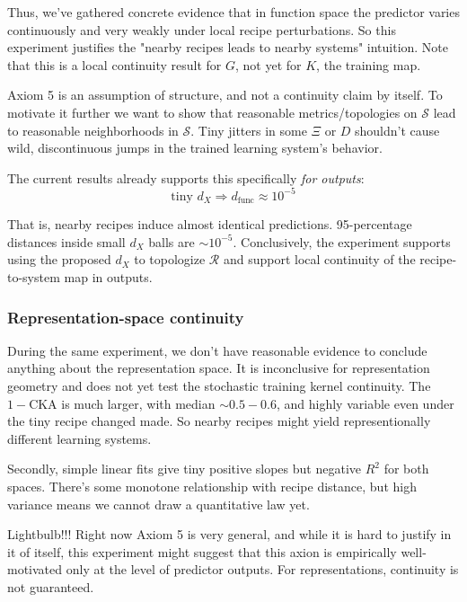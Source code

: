 \documentclass[12pt]{article}
\begin{document}
Thus, we've gathered concrete evidence that in function space the predictor varies continuously and very weakly under local recipe perturbations. So this experiment justifies the "nearby recipes leads to nearby systems" intuition. Note that this is a local continuity result for $G$, not yet for $K$, the training map.

Axiom 5 is an assumption of structure, and not a continuity claim by itself. To motivate it further we want to show that reasonable metrics/topologies on $\mathcal S$ lead to reasonable neighborhoods in $\mathcal S$. Tiny jitters in some $\Xi$ or $D$ shouldn't cause wild, discontinuous jumps in the trained learning system's behavior.

The current results already supports this specifically \textit{for outputs}: 
\[
\text{tiny } d_X\Longrightarrow d_\text{func} \approx 10^{-5}
\]

That is, nearby recipes induce almost identical predictions. 95-percentage distances inside small $d_X$ balls are $\sim 10^{-5}$. Conclusively, the experiment supports using the proposed $d_X$ to topologize $\mathcal R$ and support local continuity of the recipe-to-system map in outputs. 

\subsubsection{Representation-space continuity}

During the same experiment, we don't have reasonable evidence to conclude anything about the representation space. It is inconclusive for representation geometry and does not yet test the stochastic training kernel continuity. The $1-\text{CKA}$ is much larger, with median $\sim 0.5-0.6$, and highly variable even under the tiny recipe changed made. So nearby recipes might yield representionally different learning systems. 

Secondly, simple linear fits give tiny positive slopes but negative $R^2$ for both spaces. There’s some monotone relationship with recipe distance, but high variance means we cannot draw a quantitative law yet.

Lightbulb!!! Right now Axiom 5 is very general, and while it is hard to justify in it of itself, this experiment might suggest that this axion is empirically well-motivated only at the level of predictor outputs. For representations, continuity is not guaranteed.

\clearpage
\appendix
\end{document}
